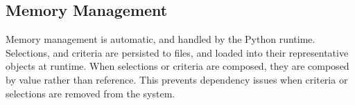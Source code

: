 \subsection{Memory Management}
Memory management is automatic, and handled by the Python runtime. Selections, and criteria are persisted to files, and loaded into their representative objects at runtime. When selections or criteria are composed, they are composed by value rather than reference. This prevents dependency issues when criteria or selections are removed from the system.